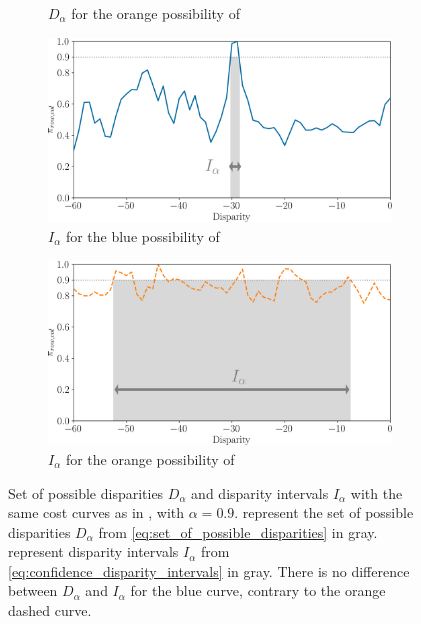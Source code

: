 \begin{figure}
\begin{subfigure}[t]{0.47\linewidth}
        \caption{$D_\alpha$ for the orange possibility of }
        \label{fig:disparity_intervals_b}
    \end{subfigure}
    \begin{subfigure}[t]{0.47\linewidth}
        \centering
        \includegraphics[width=\linewidth]{Images/Chap_5/disparity_interval_3.png}
        \caption{$I_\alpha$ for the blue possibility of }
        \label{fig:disparity_intervals_c}
    \end{subfigure}\hfill
    \begin{subfigure}[t]{0.47\linewidth}
        \centering
        \includegraphics[width=\linewidth]{Images/Chap_5/disparity_interval_4.png}
        \caption{$I_\alpha$ for the orange possibility of }
        \label{fig:disparity_intervals_d}
    \end{subfigure}\hfill
    \caption{Set of possible disparities $D_\alpha$ and disparity intervals $I_\alpha$ with the same cost curves as in  , with $\alpha=0.9$.  represent the set of possible disparities $D_\alpha$ from \cref{eq:set_of_possible_disparities} in gray.  represent disparity intervals $I_\alpha$ from \cref{eq:confidence_disparity_intervals} in gray. There is no difference between $D_\alpha$ and $I_\alpha$ for the blue curve, contrary to the orange dashed curve.}
    \label{fig:disparity_sets_and_intervals}
\end{figure}

